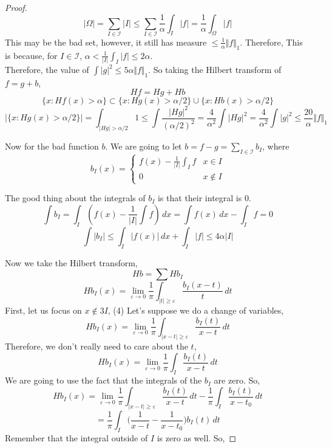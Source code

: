 \documentclass[12pt]{article}
\begin{document}
\begin{proof}
$$ \vert \Omega \vert = \sum_{I \in \mathcal{I}} \vert I \vert \leq \sum_{I \in \mathcal{I}} \frac{1}{\alpha} \int_I \vert f \vert  = \frac{1}{\alpha} \int_\Omega \vert f \vert$$
This may be the bad set, however, it still has measure $\leq \frac{1}{\alpha} \Vert f \Vert_1$. Therefore, 
This is because, for $I \in \mathcal{I}$, $\alpha < \frac{1}{\vert  I \vert} \int_I \vert f \vert \leq 2\alpha$. \\

Therefore, the value of $\int \vert g \vert^2 \leq 5\alpha \Vert f \Vert_1$. So taking the Hilbert transform of $f= g +b$, 
$$Hf = Hg + Hb$$
$$\{x : Hf(x) > \alpha\} \subset \{x: Hg(x) > \alpha/2\} \cup \{x: Hb(x)> \alpha/2\}$$
$$\vert \{ x: Hg(x) > \alpha/2\} \vert = \int_{\vert Hg \vert > \alpha/2} 1 \leq \int \frac{\vert Hg\vert^2}{(\alpha/2)^2} = \frac{4}{\alpha^2}\int \vert Hg \vert^2
= \frac{4}{\alpha^2} \int \vert g \vert^2 \leq \frac{20}{\alpha} \Vert f \Vert_1$$

\noindent Now for the bad function $b$. We are going to let $b = f-g = \sum_{I \in \mathcal{I}} b_{I}$, where $$b_I(x) = \begin{cases}
f(x)- \frac{1}{\vert I \vert} \int_I f & x \in I \\
0 & x \not \in I
\end{cases}$$ 

The good thing about the integrals of $b_I$ is that their integral is $0$. 
$$\int b_I = \int_I (f(x) - \frac{1}{\vert I \vert} \int f) \,dx = \int f(x)\,dx - \int_I f= 0$$
$$ \int \vert b_I \vert \leq \int_I \vert f(x) \vert \,dx + \int_I \vert f \vert \leq 4\alpha\vert I \vert$$

Now we take the Hilbert transform,
$$Hb = \sum Hb_I$$
$$Hb_I(x) = \lim_{\varepsilon \rightarrow 0} \frac{1}{\pi} \int_{\vert t \vert \geq \varepsilon} \frac{b_I(x-t)}{t} \,dt$$
First, let us focus on $x \not \in 3I$, 
(4)
Let's suppose we do a change of variables,
$$Hb_I(x) = \lim_{\varepsilon \rightarrow 0} \frac{1}{\pi} \int_{\vert x-t \vert \geq \varepsilon} \frac{b_I(t)}{x-t} \,dt$$
Therefore, we don't really need to care about the $t$,
$$Hb_I(x) = \lim_{\varepsilon \rightarrow 0} \frac{1}{\pi} \int_I \frac{b_I(t)}{x-t} \,dt$$
We are going to use the fact that the integrals of the $b_I$ are zero. 
So, 
$$Hb_I(x) = \lim_{\varepsilon \rightarrow 0} \frac{1}{\pi} \int_{\vert x-t \vert \geq \varepsilon} \frac{b_I(t)}{x-t} \,dt - \frac{1}{\pi} \int_I \frac{b_I(t)}{x-t_0} \,dt$$
$$= \frac{1}{\pi} \int_I \Big(\frac{1}{x-t} - \frac{1}{x-t_0} \Big) b_I(t) \, dt$$
Remember that the integral outside of $I$ is zero as well. So, 


\end{proof}
\end{document}
